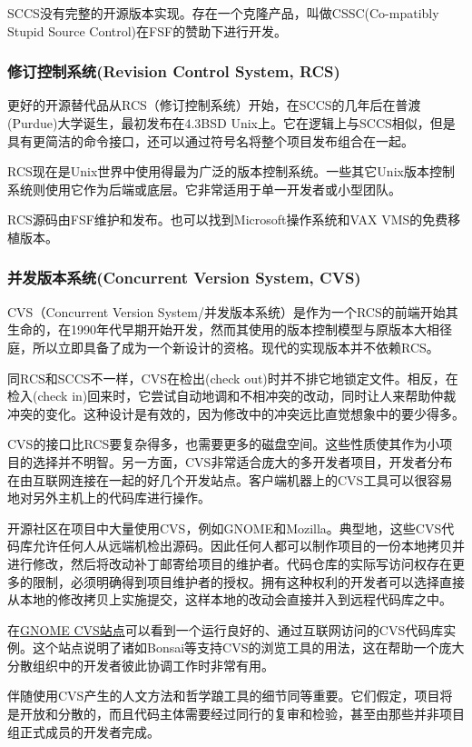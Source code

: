 \documentclass[12pt,oneside]{ctexbook}
\begin{document}
\begin{common-format}
SCCS没有完整的开源版本实现。存在一个克隆产品，叫做CSSC(Co-mpatibly Stupid Source Control)在FSF的赞助下进行开发。

\subsubsection{修订控制系统(Revision Control System, RCS)}
更好的开源替代品从RCS（修订控制系统）开始，在SCCS的几年后在普渡(Purdue)大学诞生，最初发布在4.3BSD Unix上。它在逻辑上与SCCS相似，但是具有更简洁的命令接口，还可以通过符号名将整个项目发布组合在一起。

RCS现在是Unix世界中使用得最为广泛的版本控制系统。一些其它Unix版本控制系统则使用它作为后端或底层。它非常适用于单一开发者或小型团队。

RCS源码由FSF维护和发布。也可以找到Microsoft操作系统和VAX VMS的免费移植版本。

\subsubsection{并发版本系统(Concurrent Version System, CVS)}
CVS（Concurrent Version System/并发版本系统）是作为一个RCS的前端开始其生命的，在1990年代早期开始开发，然而其使用的版本控制模型与原版本大相径庭，所以立即具备了成为一个新设计的资格。现代的实现版本并不依赖RCS。

同RCS和SCCS不一样，CVS在检出(check out)时并不排它地锁定文件。相反，在检入(check in)回来时，它尝试自动地调和不相冲突的改动，同时让人来帮助仲裁冲突的变化。这种设计是有效的，因为修改中的冲突远比直觉想象中的要少得多。

CVS的接口比RCS要复杂得多，也需要更多的磁盘空间。这些性质使其作为小项目的选择并不明智。另一方面，CVS非常适合庞大的多开发者项目，开发者分布在由互联网连接在一起的好几个开发站点。客户端机器上的CVS工具可以很容易地对另外主机上的代码库进行操作。

开源社区在项目中大量使用CVS，例如GNOME和Mozilla。典型地，这些CVS代码库允许任何人从远端机检出源码。因此任何人都可以制作项目的一份本地拷贝并进行修改，然后将改动补丁邮寄给项目的维护者。代码仓库的实际写访问权存在更多的限制，必须明确得到项目维护者的授权。拥有这种权利的开发者可以选择直接从本地的修改拷贝上实施提交，这样本地的改动会直接并入到远程代码库之中。

在\href{http://cvs.gnome.org/}{GNOME CVS站点}可以看到一个运行良好的、通过互联网访问的CVS代码库实例。这个站点说明了诸如Bonsai等支持CVS的浏览工具的用法，这在帮助一个庞大分散组织中的开发者彼此协调工作时非常有用。

伴随使用CVS产生的人文方法和哲学踉工具的细节同等重要。它们假定，项目将是开放和分散的，而且代码主体需要经过同行的复审和检验，甚至由那些并非项目组正式成员的开发者完成。


\end{common-format}
\end{document}
